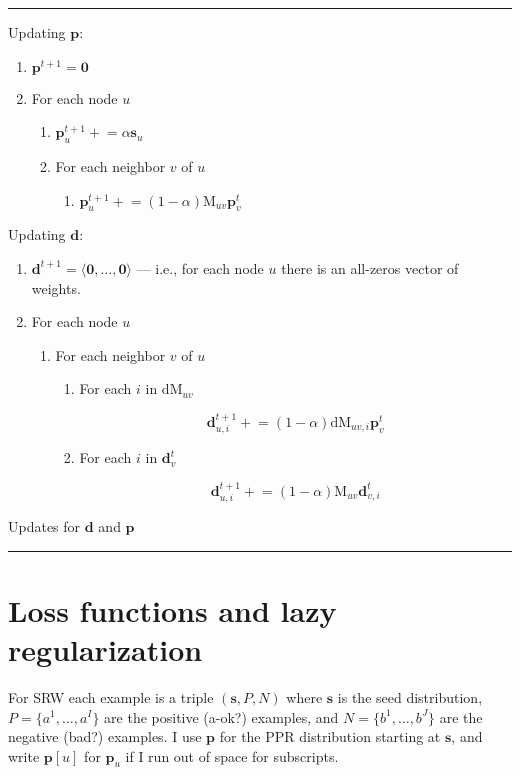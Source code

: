 \documentclass[12pt]{article}
\newcommand{\vek}[1]{\textbf{#1}}
\newcommand{\M}{\textrm{M}}
\newcommand{\dM}{\textrm{dM}}
\begin{document}
\begin{table}
\hrule

Updating $\vek{p}$:
\begin{enumerate}
\item $\vek{p}^{t+1} = \vek{0}$
\item For each node $u$ 
  \begin{enumerate}
  \item $\vek{p}^{t+1}_u +\!\!= \alpha \vek{s}_u$
  \item For each neighbor $v$ of $u$
    \begin{enumerate}
    \item $\vek{p}^{t+1}_u +\!\!= (1-\alpha) \M_{uv} \vek{p}^t_v$
    \end{enumerate}
  \end{enumerate}
\end{enumerate}

Updating $\vek{d}$:
\begin{enumerate}
\item $\vek{d}^{t+1} = \langle \vek{0}, \ldots, \vek{0} \rangle$ --- i.e., for each node $u$ there is an all-zeros
  vector of weights.
\item For each node $u$ 
  \begin{enumerate}
  \item For each neighbor $v$ of $u$
    \begin{enumerate}
      \item For each $i$ in $\dM_{uv}$

      \[ \vek{d}^{t+1}_{u,i} +\!\!= (1-\alpha) \dM_{uv,i} \vek{p}^t_v \]
      \item For each $i$ in $\vek{d}^t_{v}$

      \[ \vek{d}^{t+1}_{u,i} +\!\!= (1-\alpha) \M_{uv} \vek{d}^t_{v,i} \]
    \end{enumerate}
  \end{enumerate}
\end{enumerate}
\caption{Updates for $\vek{d}$ and $\vek{p}$} \label{alg:updates}
\hrule
\end{table}

\section{Loss functions and lazy regularization}

For SRW each example is a triple $(\vek{s},P,N)$ where $\vek{s}$ is
the seed distribution, $P=\{a^1,\ldots,a^I\}$ are the positive (a-ok?)
examples, and $N=\{b^1,\ldots,b^J\}$ are the negative (bad?) examples.
I use $\vek{p}$ for the PPR distribution starting at $\vek{s}$, and
write $\vek{p}[u]$ for $\vek{p}_u$ if I run out of space for
subscripts.
\end{document}
